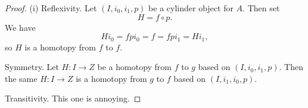 \begin{proof}\renewcommand{\qed}{\hfill\tit{To be continued...}}
(i) Reflexivity. Let $(I,i_0,i_1,p)$ be a cylinder object for $A$. Then set
\[H=f\circ p.\]
We have 
\[Hi_0=fpi_0=f=fpi_1=Hi_1,\]
so $H$ is a homotopy from $f$ to $f$.

Symmetry. Let $H:I\to Z$ be a homotopy from $f$ to $g$ based on $(I,i_0,i_1,p)$. Then the same $H:I\to Z$ is a homotopy from $g$ to $f$ based on $(I,i_1,i_0,p)$.

Transitivity. This one is annoying.

\medskip
{}
\smallskip

\end{proof}
